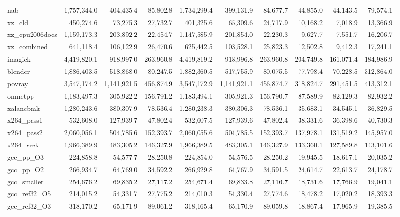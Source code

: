 \documentclass[10pt,a4paper]{article}
\begin{document}
{\begin{longtable}{@{}lrrrrrrrrr@{}}
nab & 1,757,344.0 & 404,435.4 & 85,802.8 & 1,734,299.4 & 399,131.9 & 84,677.7 & 44,855.0 & 44,143.5 & 79,574.1 \\
xz\_cld & 450,274.6 & 73,275.3 & 27,732.7 & 401,325.6 & 65,309.6 & 24,717.9 & 10,168.2 & 7,018.9 & 13,366.9 \\
xz\_cpu2006docs & 1,159,173.3 & 203,892.2 & 22,454.7 & 1,147,585.9 & 201,854.0 & 22,230.3 & 9,627.7 & 7,551.7 & 16,206.7 \\
xz\_combined & 641,118.4 & 106,122.9 & 26,470.6 & 625,442.5 & 103,528.1 & 25,823.3 & 12,502.8 & 9,412.3 & 17,241.1 \\
imagick & 4,419,820.1 & 918,997.0 & 263,960.8 & 4,419,819.2 & 918,996.8 & 263,960.8 & 204,749.8 & 161,071.4 & 184,986.9 \\
blender & 1,886,403.5 & 518,868.0 & 80,247.5 & 1,882,360.5 & 517,755.9 & 80,075.5 & 77,798.4 & 70,228.5 & 312,864.0 \\
povray & 3,547,174.2 & 1,141,921.5 & 456,874.9 & 3,547,172.9 & 1,141,921.1 & 456,874.7 & 318,824.7 & 291,451.5 & 413,312.1 \\
omnetpp & 1,183,497.3 & 305,922.2 & 156,791.2 & 1,183,494.1 & 305,921.3 & 156,790.7 & 87,589.9 & 82,129.3 & 82,932.2 \\
xalancbmk & 1,280,243.6 & 380,307.9 & 78,536.4 & 1,280,238.3 & 380,306.3 & 78,536.1 & 35,683.1 & 34,545.1 & 36,829.5 \\
x264\_pass1 & 532,608.0 & 127,939.7 & 47,802.4 & 532,607.5 & 127,939.6 & 47,802.4 & 38,331.6 & 36,398.6 & 40,730.3 \\
x264\_pass2 & 2,060,056.1 & 504,785.6 & 152,393.7 & 2,060,055.6 & 504,785.5 & 152,393.7 & 137,978.1 & 131,519.2 & 145,957.0 \\
x264\_seek & 1,966,389.9 & 483,305.2 & 146,327.9 & 1,966,389.5 & 483,305.1 & 146,327.9 & 133,360.1 & 127,589.8 & 143,101.6 \\
gcc\_pp\_O3 & 224,858.8 & 54,577.7 & 28,250.8 & 224,854.0 & 54,576.5 & 28,250.2 & 19,945.5 & 18,617.1 & 20,035.2 \\
gcc\_pp\_O2 & 266,934.7 & 64,769.0 & 34,592.2 & 266,929.8 & 64,767.9 & 34,591.5 & 24,614.7 & 22,613.7 & 24,178.7 \\
gcc\_smaller & 254,676.2 & 69,835.2 & 27,117.2 & 254,671.4 & 69,833.8 & 27,116.7 & 18,731.6 & 17,766.9 & 19,041.1 \\
gcc\_ref32\_O5 & 214,015.2 & 54,331.7 & 27,775.2 & 214,010.3 & 54,330.4 & 27,774.6 & 18,478.2 & 17,020.2 & 18,393.3 \\
gcc\_ref32\_O3 & 318,170.2 & 65,171.9 & 89,061.2 & 318,165.4 & 65,170.9 & 89,059.8 & 18,867.4 & 17,965.9 & 19,385.5 \\

\end{longtable}}
\end{document}

